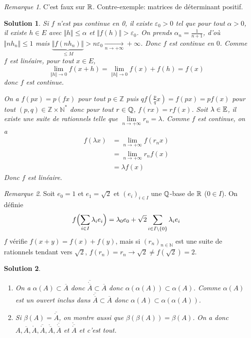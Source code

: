 \documentclass[12pt]{article}
\newtheorem{solution}{Solution}[section]
\theoremstyle{remark}
\newtheorem{remark}{Remarque}[section]
\newcommand{\N}{\mathbb{N}} \newcommand{\Z}{\mathbb{Z}}
\begin{document}
\begin{remark}
	C'est faux sur $\mathbb{R}$. Contre-exemple: matrices de déterminant positif.
\end{remark}

\begin{solution}
	Si $f$ n'est pas continue en 0, il existe $\varepsilon_{0}>0$ tel que pour tout $\alpha>0$, il existe $h\in E$ avec $\Vert h\Vert\leqslant\alpha$ et $\Vert f(h)\Vert>\varepsilon_{0}$. On prends $\alpha_{n}=\frac{1}{n+1}$, d'où $\Vert nh_{n}\Vert\leqslant1$ mais $\underbrace{\Vert f(nh_{n})\Vert}_{\leqslant M}>n\varepsilon_{0}\xrightarrow[n\to+\infty]{}+\infty$. Donc $f$ est continue en $0$. Comme $f$ est linéaire, pour tout $x\in E$,
	$$\lim\limits_{\Vert h\Vert\to0}f(x+h)=\lim\limits_{\Vert h\Vert\to0}f(x)+f(h)=f(x)$$
	donc $f$ est continue.

	On a $f(px)=p(fx)$ pour tout $p\in\Z$ puis $qf(\frac{p}{q}x)=f(px)=pf(x)$ pour tout $(p,q)\in\Z\times\N^{*}$ donc pour tout $r\in\mathbb{Q}$, $f(rx)=rf(x)$.
	Soit $\lambda\in\mathbb{E}$, il existe une suite de rationnels telle que $\lim\limits_{n\to+\infty} r_{n}=\lambda$. Comme $f$ est continue, on a 
	\begin{align*}
		f(\lambda x)
		&=\lim\limits_{n\to+\infty}f(r_{n}x)\\
		&=\lim\limits_{n\to+\infty}r_{n}f(x)\\
		&=\lambda f(x)
	\end{align*}
	Donc $f$ est linéaire.
\end{solution}

\begin{remark}
	Soit $e_{0}=1$ et $e_{1}=\sqrt{2}$ et $(e_{i})_{i\in I}$ une $\mathbb{Q}$-base de $\mathbb{R}$ ($0\in I$). On définie 
	$$f\Bigl(\sum_{i\in I}\lambda_{i} e_{i}\Bigr)=\lambda_{0}e_{0}+\sqrt{2}\sum_{i\in I\setminus\{0\}}\lambda_{i}e_{i}$$
	$f$ vérifie $f(x+y)=f(x)+f(y)$, mais si $(r_{n})_{n\in\N}$ est une suite de rationnels tendant vers $\sqrt{2}$, $f(r_{n})=r_{n}\to\sqrt{2}\neq f(\sqrt{2})=2$.
\end{remark}

\begin{solution}
	\phantom{}
	\begin{enumerate}
		\item On a $\alpha(A)\subset \overline{A}$ donc $\overline{\mathring{\overline{A}}}\subset\overline{A}$ donc $\alpha(\alpha(A))\subset\alpha(A)$. Comme $\alpha(A)$ est un ouvert inclus dans $\overline{\mathring{\overline{A}}}\subset\overline{A}$ donc $\alpha(A)\subset\alpha(\alpha(A))$.

		\item Si $\beta(A)=\overline{\mathring{A}}$, on montre aussi que $\beta(\beta(A))=\beta(A)$. On a donc $A,\overline{A},\mathring{A},\overline{\mathring{A}},\mathring{\overline{A}},\overline{\mathring{\overline{A}}}$ et $\mathring{\overline{\mathring{A}}}$ et c'est tout.
	\end{enumerate}
\end{solution}
\end{document}
